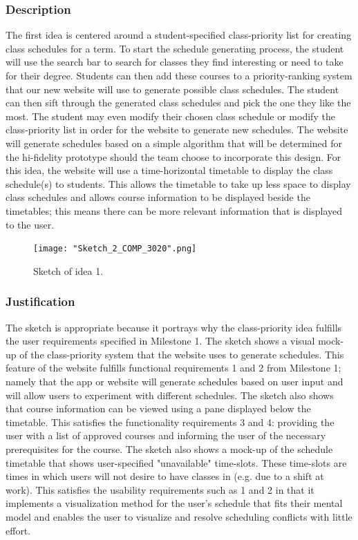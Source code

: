 \documentclass{article}
\begin{document}
\subsubsection{Description}
The first idea is centered around a student-specified class-priority list for creating class schedules for a term. To start the schedule generating process, the student will use the search bar to search for classes they find interesting or need to take for their degree. Students can then add these courses to a priority-ranking system that our new website will use to generate possible class schedules. The student can then sift through the generated class schedules and pick the one they like the most. The student may even modify their chosen class schedule or modify the class-priority list in order for the website to generate new schedules. The website will generate schedules based on a simple algorithm that will be determined for the hi-fidelity prototype should the team choose to incorporate this design. For this idea, the website will use a time-horizontal timetable to display the class schedule(s) to students. This allows the timetable to take up less space to display class schedules and allows course information to be displayed beside the timetables; this means there can be more relevant information that is displayed to the user. 

\begin{figure}[!h]
\centering
\caption{Sketch of idea 1.}
\texttt{[image: "Sketch\_2\_COMP\_3020".png]}
\end{figure}

\subsubsection{Justification}
The sketch is appropriate because it portrays why the class-priority idea fulfills the user requirements specified in Milestone 1. The sketch shows a visual mock-up of the class-priority system that the website uses to generate schedules. This feature of the website fulfills functional requirements 1 and 2 from Milestone 1; namely that the app or website will generate schedules based on user input and will allow users to experiment with different schedules. The sketch also shows that course information can be viewed using a pane displayed below the timetable. This satisfies the functionality requirements 3 and 4: providing the user with a list of approved courses and informing the user of the necessary prerequisites for the course. The sketch also shows a mock-up of the schedule timetable that shows user-specified "unavailable" time-slots. These time-slots are times in which users will not desire to have classes in (e.g. due to a shift at work). This satisfies the usability requirements such as 1 and 2 in that it implements a visualization method for the user's schedule that fits their mental model and enables the user to visualize and resolve scheduling conflicts with little effort.
\end{document}
